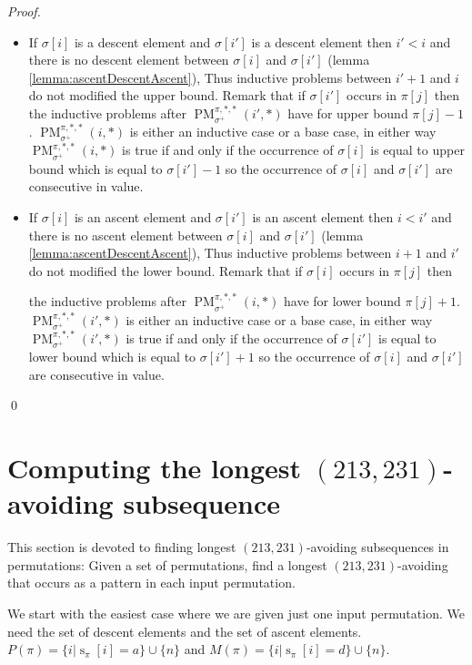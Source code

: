 \documentclass[a4paper]{llncs}
\newcommand{\ptext}{\pi}
\newcommand{\pmotif}{\sigma}
\DeclareMathOperator{\stripea}{s}
\newcommand{\stripe}[2]{\stripea_{{#1}}[{#2}]}
\newcommand{\dstep}{d}
\newcommand{\ustep}{a}
\newcommand{\pbmotif}{\pmotif^+}
\DeclareMathOperator{\PMa}{PM}
\newcommand{\PM}[6]{\PMa_{{#1}}^{{#2},{#3},{#4}}({#5},{#6})}
\begin{document}
\begin{proof}
\begin{itemize}
\begin{itemize}
			\item If $\pmotif[i]$ is a descent element and $\pmotif[i']$ is a descent element then $i'<i$ and there is no descent element between $\pmotif[i]$ and $\pmotif[i']$ (lemma \ref{lemma:ascentDescentAscent}), Thus inductive problems between $i'+1$ and $i$ do not modified the upper bound. Remark that if $\pmotif[i']$ occurs in $\ptext[j]$ then 
			the inductive problems after $\PM{\pbmotif}{\ptext}{*}{*}{i'}{*}$ have for upper bound $\ptext[j]-1$. $\PM{\pbmotif}{\ptext}{*}{*}{i}{*}$ is either an inductive case or a base case, in either way  $\PM{\pbmotif}{\ptext}{*}{*}{i}{*}$ is true if and only if the occurrence of $\sigma[i]$ is equal to upper bound which is equal to $\sigma[i']-1$ so the occurrence of $\pmotif[i]$ and $\pmotif[i']$ are consecutive in value.
			
			\item If $\pmotif[i]$ is an ascent element and $\pmotif[i']$ is an ascent element then $i<i'$ and there is no  ascent element between $\pmotif[i]$ and $\pmotif[i']$ (lemma \ref{lemma:ascentDescentAscent}), Thus inductive problems between $i+1$ and $i'$ do not modified the lower bound. Remark that if $\pmotif[i]$ occurs in $\ptext[j]$ then 

			the inductive problems after $\PM{\pbmotif}{\ptext}{*}{*}{i}{*}$ have for lower bound $\ptext[j]+1$. $\PM{\pbmotif}{\ptext}{*}{*}{i'}{*}$ is either an inductive case or a base case, in either way  $\PM{\pbmotif}{\ptext}{*}{*}{i'}{*}$ is true if and only if the occurrence of $\sigma[i']$ is equal to lower bound which is equal to $\sigma[i']+1$ so the occurrence of $\pmotif[i]$ and $\pmotif[i']$ are consecutive in value.
		\end{itemize}
\end{itemize}
\qed
\end{proof}



\section{Computing the longest $(213,231)$-avoiding subsequence}
\label{section:LCS}

	This section is devoted to finding longest $(213,231)$-avoiding subsequences in permutations:
	Given a set of permutations, find a longest $(213,231)$-avoiding that occurs as a pattern
	in each input permutation.

	We start with the easiest case where we are given just one input permutation.
	We need the set of descent elements and the set of ascent elements.
	$P(\pi) = \{i | \stripe{\pi}{i} = \ustep \} \cup \{n\}$ and
	$M(\pi) = \{i | \stripe{\pi}{i} = \dstep \} \cup \{n\}$.\\
\end{document}
